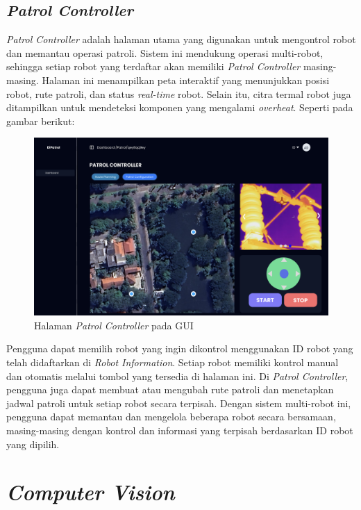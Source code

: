 \subsection{\emph{Patrol Controller}}

\emph{Patrol Controller} adalah halaman utama yang digunakan untuk mengontrol robot dan memantau operasi patroli. Sistem ini mendukung operasi multi-robot, sehingga setiap robot yang terdaftar akan memiliki \emph{Patrol Controller} masing-masing. Halaman ini menampilkan peta interaktif yang menunjukkan posisi robot, rute patroli, dan status \emph{real-time} robot. Selain itu, citra termal robot juga ditampilkan untuk mendeteksi komponen yang mengalami \emph{overheat}. Seperti pada gambar berikut:

\begin{figure}[H] \centering
  \includegraphics[scale=0.5]{gambar/patrol_control.png}
  \caption{Halaman \emph{Patrol Controller} pada GUI}
  \label{fig:Patrol Controller}
\end{figure}

Pengguna dapat memilih robot yang ingin dikontrol menggunakan ID robot yang telah didaftarkan di \emph{Robot Information}. Setiap robot memiliki kontrol manual dan otomatis melalui tombol yang tersedia di halaman ini. Di \emph{Patrol Controller}, pengguna juga dapat membuat atau mengubah rute patroli dan menetapkan jadwal patroli untuk setiap robot secara terpisah. Dengan sistem multi-robot ini, pengguna dapat memantau dan mengelola beberapa robot secara bersamaan, masing-masing dengan kontrol dan informasi yang terpisah berdasarkan ID robot yang dipilih.

\section{\emph{Computer Vision}}

